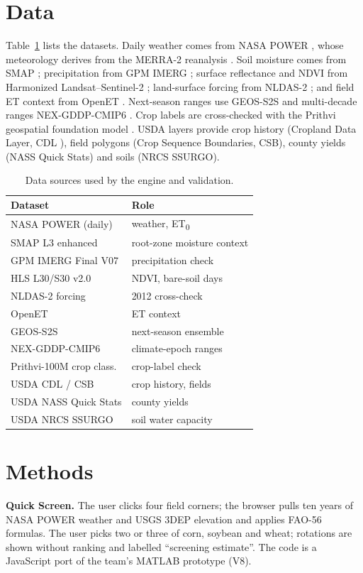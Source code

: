 \documentclass[10pt,twocolumn]{article}
\begin{document}
\section{Data}
Table~\ref{tab:data} lists the datasets. Daily weather comes from NASA POWER \citep{sparks2018}, whose meteorology derives from the MERRA-2 reanalysis \citep{gelaro2017}. Soil moisture comes from SMAP \citep{entekhabi2010,ds_smap}; precipitation from GPM IMERG \citep{hou2014,ds_imerg}; surface reflectance and NDVI from Harmonized Landsat--Sentinel-2 \citep{claverie2018,ds_hlsl30,ds_hlss30}; land-surface forcing from NLDAS-2 \citep{xia2012,ds_nldas}; and field ET context from OpenET \citep{melton2022}. Next-season ranges use GEOS-S2S \citep{molod2020} and multi-decade ranges NEX-GDDP-CMIP6 \citep{thrasher2022,ds_nexgddp}. Crop labels are cross-checked with the Prithvi geospatial foundation model \citep{jakubik2023,ds_prithvi}. USDA layers provide crop history (Cropland Data Layer, CDL \citep{boryan2011}), field polygons (Crop Sequence Boundaries, CSB), county yields (NASS Quick Stats) and soils (NRCS SSURGO).

\begin{table}[t]
\centering\small
\caption{Data sources used by the engine and validation.}
\label{tab:data}
\begin{tabular}{@{}ll@{}}
\toprule
Dataset & Role \\
\midrule
NASA POWER (daily) & weather, ET\textsubscript{0} \\
SMAP L3 enhanced & root-zone moisture context \\
GPM IMERG Final V07 & precipitation check \\
HLS L30/S30 v2.0 & NDVI, bare-soil days \\
NLDAS-2 forcing & 2012 cross-check \\
OpenET & ET context \\
GEOS-S2S & next-season ensemble \\
NEX-GDDP-CMIP6 & climate-epoch ranges \\
Prithvi-100M crop class. & crop-label check \\
USDA CDL / CSB & crop history, fields \\
USDA NASS Quick Stats & county yields \\
USDA NRCS SSURGO & soil water capacity \\
\bottomrule
\end{tabular}
\end{table}

\section{Methods}
\textbf{Quick Screen.} The user clicks four field corners; the browser pulls ten years of NASA POWER weather and USGS 3DEP elevation and applies FAO-56 formulas. The user picks two or three of corn, soybean and wheat; rotations are shown without ranking and labelled ``screening estimate''. The code is a JavaScript port of the team's MATLAB prototype (V8).
\end{document}
